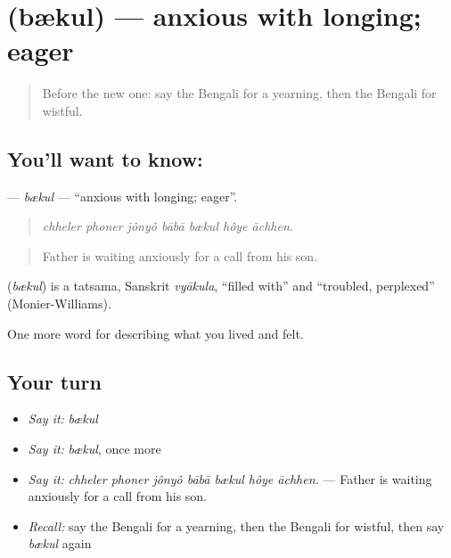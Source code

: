 \section[\texorpdfstring{\bn{ব্যাকুল} (bækul)}{ব্যাকুল (bækul)}]{ (bækul) — anxious with longing; eager}

\label{lesson:BN-C448-bekul}



\begin{quote}
Before the new one: say the Bengali for a yearning, then the Bengali for wistful.
\end{quote}

\subsection*{You'll want to know: }
\textbf{} — \emph{bækul} — \textquotedblleft{}anxious with longing; eager\textquotedblright{}.

\begin{quote}
      
\end{quote}

\begin{quote}
\emph{chheler phoner jônyô bābā bækul hôye āchhen.}
\end{quote}

\begin{quote}
Father is waiting anxiously for a call from his son.
\end{quote}

\begin{cousinweb}
\textbf{} (\emph{bækul}) is a tatsama, Sanskrit \emph{vyākula}, \textquotedblleft{}filled with\textquotedblright{} and \textquotedblleft{}troubled, perplexed\textquotedblright{} (Monier-Williams).
\end{cousinweb}

\begin{grammarlens}[title={What you've built}]
One more word for describing what you lived and felt.
\end{grammarlens}

\subsection*{Your turn}
\begin{itemize}
\raggedright
  \item \emph{Say it:} \emph{bækul}
  \item \emph{Say it:} \emph{bækul}, once more
  \item \emph{Say it:} \emph{chheler phoner jônyô bābā bækul hôye āchhen.} — Father is waiting anxiously for a call from his son.
  \item \emph{Recall:} say the Bengali for a yearning, then the Bengali for wistful, then say \emph{bækul} again
\end{itemize}

